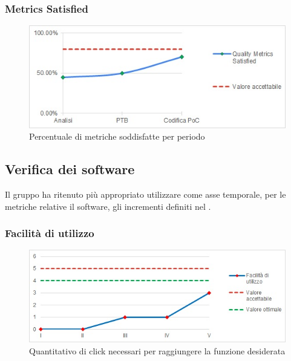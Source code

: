 \subsubsection{Metrics Satisfied}
\begin{figure}[H]
  \centering
  \includegraphics[scale=0.8]{immagini/metriche.jpg}
  \caption{Percentuale di metriche soddisfatte per periodo}
\end{figure}


\subsection{Verifica dei software}\label{subsection:verifica_software}
Il gruppo ha ritenuto più appropriato utilizzare come asse temporale, per le metriche relative il software, gli incrementi definiti nel \docNameVersionPdP{}.

\subsubsection{Facilità di utilizzo}
\begin{figure}[H]
  \centering
  \includegraphics[scale=0.8]{immagini/facilita_utilizzo.jpg}
  \caption{Quantitativo di click necessari per raggiungere la funzione desiderata}
\end{figure}

